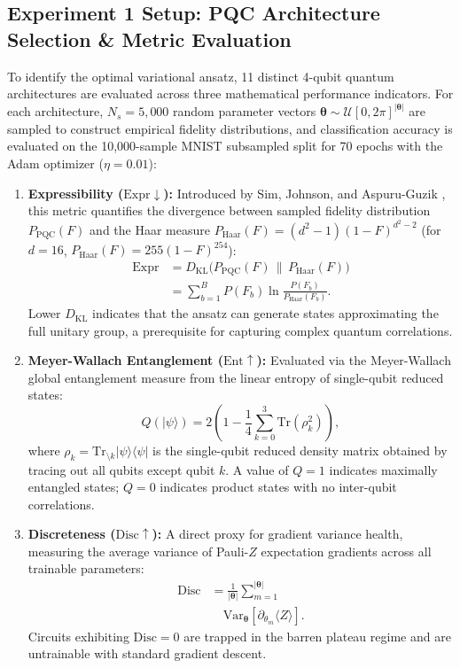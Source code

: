 \documentclass[journal]{IEEEtran}
\begin{document}
\subsection{Experiment 1 Setup: PQC Architecture Selection \& Metric Evaluation}
To identify the optimal variational ansatz, 11 distinct 4-qubit quantum architectures are evaluated across three mathematical performance indicators. For each architecture, $N_s = 5{,}000$ random parameter vectors $\boldsymbol{\theta} \sim \mathcal{U}[0, 2\pi]^{|\boldsymbol{\theta}|}$ are sampled to construct empirical fidelity distributions, and classification accuracy is evaluated on the 10,000-sample MNIST subsampled split for 70 epochs with the Adam optimizer ($\eta = 0.01$):
\begin{enumerate}
    \item \textbf{Expressibility ($\mathrm{Expr} \downarrow$):} Introduced by Sim, Johnson, and Aspuru-Guzik \cite{sim2019expressibility}, this metric quantifies the divergence between sampled fidelity distribution $P_{\mathrm{PQC}}(F)$ and the Haar measure $P_{\mathrm{Haar}}(F) = (d^2-1)(1-F)^{d^2-2}$ (for $d=16$, $P_{\mathrm{Haar}}(F) = 255(1-F)^{254}$):
    \begin{align}
    \mathrm{Expr} &= D_{\mathrm{KL}}\big( P_{\mathrm{PQC}}(F) \,\|\, P_{\mathrm{Haar}}(F) \big) \nonumber \\
    &= \sum_{b=1}^{B} P(F_b) \ln \frac{P(F_b)}{P_{\mathrm{Haar}}(F_b)}.
    \label{eq:expressibility_metric}
    \end{align}
    Lower $D_{\mathrm{KL}}$ indicates that the ansatz can generate states approximating the full unitary group, a prerequisite for capturing complex quantum correlations.
    \item \textbf{Meyer-Wallach Entanglement ($\mathrm{Ent} \uparrow$):} Evaluated via the Meyer-Wallach global entanglement measure \cite{meyer2002global} from the linear entropy of single-qubit reduced states:
    \begin{equation}
    Q(|\psi\rangle) = 2 \left( 1 - \frac{1}{4} \sum_{k=0}^{3} \mathrm{Tr}(\rho_k^2) \right),
    \label{eq:meyer_wallach}
    \end{equation}
    where $\rho_k = \mathrm{Tr}_{\setminus k} |\psi\rangle\langle\psi|$ is the single-qubit reduced density matrix obtained by tracing out all qubits except qubit $k$. A value of $Q = 1$ indicates maximally entangled states; $Q = 0$ indicates product states with no inter-qubit correlations.
    \item \textbf{Discreteness ($\mathrm{Disc} \uparrow$):} A direct proxy for gradient variance health, measuring the average variance of Pauli-$Z$ expectation gradients across all trainable parameters:
    \begin{align}
    \mathrm{Disc} &= \frac{1}{|\boldsymbol{\theta}|} \sum_{m=1}^{|\boldsymbol{\theta}|} \nonumber \\
    &\quad \mathrm{Var}_{\boldsymbol{\theta}}[\partial_{\theta_m} \langle Z \rangle].
    \label{eq:discreteness_metric}
    \end{align}
    Circuits exhibiting $\mathrm{Disc} = 0$ are trapped in the barren plateau regime and are untrainable with standard gradient descent.
\end{enumerate}
\end{document}
